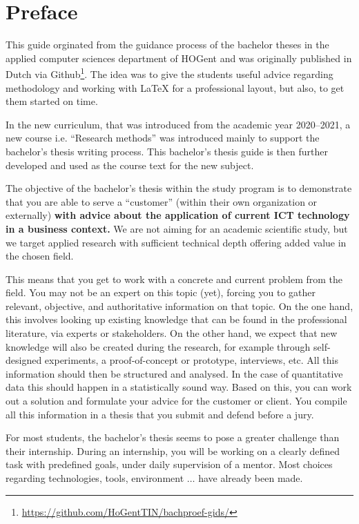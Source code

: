\chapter*{Preface}
\label{ch:preface}

This guide orginated from the guidance process of the bachelor theses in the applied computer sciences department of HOGent and was originally published in Dutch via  Github\footnote{\url{https://github.com/HoGentTIN/bachproef-gids/}}. The idea was to give the students useful advice regarding methodology and working with {\LaTeX} for a professional layout, but also, to get them started on time.

In the new curriculum, that was introduced from the academic year 2020--2021, a new course i.e. ``Research methods'' was introduced mainly to support the bachelor's thesis writing process. This bachelor's thesis guide is then further developed and used as the course text for the new subject.

The objective of the bachelor's thesis within the study program is to demonstrate that you are able to serve a ``customer'' (within their own organization or externally) \textbf{with advice about the application of current ICT technology in a business context. } We are not aiming for an academic scientific study, but we target applied research with sufficient technical depth offering added value in the chosen field.

This means that you get to work with a concrete and current problem from the field. You may not be an expert on this topic (yet), forcing you to gather relevant, objective, and authoritative information on that topic. On the one hand, this involves looking up existing knowledge that can be found in the professional literature, via experts or stakeholders. On the other hand, we expect that new knowledge will also be created during the research, for example through self-designed experiments, a proof-of-concept or prototype, interviews, etc. All this information should then be structured and analysed. In the case of quantitative data this should happen in a statistically sound way. Based on this, you can work out a solution and formulate your advice for the customer or client. You compile all this information in a thesis that you submit and defend before a jury.

For most students, the bachelor's thesis seems to pose a greater challenge than their internship. During an internship, you will be working on a clearly defined task with predefined goals, under daily supervision of a mentor. Most choices regarding technologies, tools, environment $\ldots$ have already been made.

